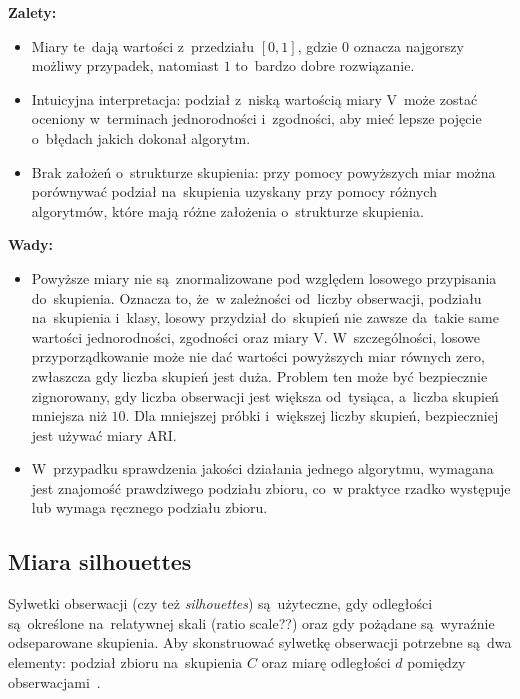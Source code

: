 \documentclass{praca1}
\begin{document}
\textbf{Zalety:}
\begin{itemize}
\item Miary te~dają wartości z~przedziału $[0, 1]$, gdzie $0$ oznacza najgorszy możliwy przypadek, natomiast $1$ to~bardzo dobre rozwiązanie.
\item Intuicyjna interpretacja: podział z~niską wartością miary V~może zostać oceniony w~terminach jednorodności i~zgodności, aby mieć lepsze pojęcie o~błędach jakich dokonał algorytm.
\item Brak założeń o~strukturze skupienia: przy pomocy powyższych miar można porównywać podział na~skupienia uzyskany przy pomocy różnych algorytmów, które mają różne założenia o~strukturze skupienia.
\end{itemize}


\textbf{Wady:}
\begin{itemize}
\item Powyższe miary nie są~znormalizowane pod względem losowego przypisania do~skupienia. Oznacza to, że~w zależności od~liczby obserwacji, podziału na~skupienia i~klasy, losowy przydział do~skupień nie zawsze da~takie same wartości jednorodności, zgodności oraz miary V. W~szczególności, losowe przyporządkowanie może nie dać wartości powyższych miar równych zero, zwłaszcza gdy liczba skupień jest duża. Problem ten może być bezpiecznie zignorowany, gdy liczba obserwacji jest większa od~tysiąca, a~liczba skupień mniejsza niż $10$. Dla mniejszej próbki i~większej liczby skupień, bezpieczniej jest używać miary ARI.
\item W~przypadku sprawdzenia jakości działania jednego algorytmu, wymagana jest znajomość prawdziwego podziału zbioru, co~w praktyce rzadko występuje lub wymaga ręcznego podziału zbioru.
\end{itemize}

\subsection{Miara silhouettes}

Sylwetki obserwacji (czy też \emph{silhouettes}) są~użyteczne, gdy odległości są~określone na~relatywnej skali (ratio scale??) oraz gdy pożądane są~wyraźnie odseparowane skupienia. Aby skonstruować sylwetkę obserwacji potrzebne są~dwa elementy: podział zbioru na~skupienia $C$ oraz miarę odległości $d$ pomiędzy obserwacjami~\cite{Rousseeuw1987:silhoutte}.
\end{document}
